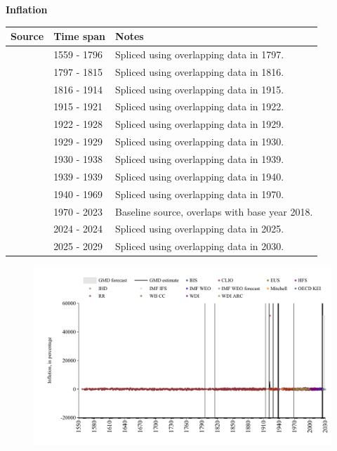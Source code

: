 \documentclass[12pt,a4paper,landscape]{article}
\begin{document}
\begin{adjustbox}{max totalsize={\paperwidth}{\paperheight},center}
\begin{minipage}[t][\textheight][t]{\textwidth}
\vspace*{0.5cm}
{}
\begin{center}
{\Large\bfseries Inflation}
\end{center}
\vspace{0.5cm}
\begin{table}[H]
\centering
\small
\begin{tabular}{|l|l|l|}
\hline
\textbf{Source} & \textbf{Time span} & \textbf{Notes} \\
\hline
\rowcolor{white}\cite{CLIO}& 1559 - 1796 &Spliced using overlapping data in 1797. \\
\rowcolor{lightgray}\cite{RR}& 1797 - 1815 &Spliced using overlapping data in 1816. \\
\rowcolor{white}\cite{CLIO}& 1816 - 1914 &Spliced using overlapping data in 1915. \\
\rowcolor{lightgray}\cite{Mitchell}& 1915 - 1921 &Spliced using overlapping data in 1922. \\
\rowcolor{white}\cite{CLIO}& 1922 - 1928 &Spliced using overlapping data in 1929. \\
\rowcolor{lightgray}\cite{RR}& 1929 - 1929 &Spliced using overlapping data in 1930. \\
\rowcolor{white}\cite{CLIO}& 1930 - 1938 &Spliced using overlapping data in 1939. \\
\rowcolor{lightgray}\cite{RR}& 1939 - 1939 &Spliced using overlapping data in 1940. \\
\rowcolor{white}\cite{CLIO}& 1940 - 1969 &Spliced using overlapping data in 1970. \\
\rowcolor{lightgray}\cite{WB_CC}& 1970 - 2023 &Baseline source, overlaps with base year 2018. \\
\rowcolor{white}\cite{BIS}& 2024 - 2024 &Spliced using overlapping data in 2025. \\
\rowcolor{lightgray}\cite{IMF_WEO_forecast}& 2025 - 2029 &Spliced using overlapping data in 2030. \\
\hline
\end{tabular}
\end{table}
\begin{figure}[H]
\centering
\includegraphics[width=\textwidth,height=0.6\textheight,keepaspectratio]{graphs/POL_infl.pdf}

\end{figure}
\end{minipage}
\end{adjustbox}
\end{document}
